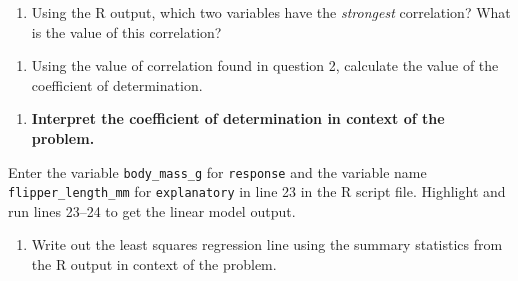 \documentclass[
]{report}
\newenvironment{Shaded}{\begin{snugshade}}{\end{snugshade}}
\newcommand{\AttributeTok}[1]{\textcolor[rgb]{0.77,0.63,0.00}{#1}}
\newcommand{\CommentTok}[1]{\textcolor[rgb]{0.56,0.35,0.01}{\textit{#1}}}
\newcommand{\FunctionTok}[1]{\textcolor[rgb]{0.00,0.00,0.00}{#1}}
\newcommand{\NormalTok}[1]{#1}
\newcommand{\OtherTok}[1]{\textcolor[rgb]{0.56,0.35,0.01}{#1}}
\newcommand{\SpecialCharTok}[1]{\textcolor[rgb]{0.00,0.00,0.00}{#1}}
\providecommand{\tightlist}{%
  \setlength{\itemsep}{0pt}\setlength{\parskip}{0pt}}
\begin{document}
\begin{enumerate}
\def\labelenumi{\arabic{enumi}.}
\setcounter{enumi}{1}
\tightlist
\item
  Using the R output, which two variables have the \emph{strongest} correlation? What is the value of this correlation?
\end{enumerate}

\vspace{0.5in}

\begin{enumerate}
\def\labelenumi{\arabic{enumi}.}
\setcounter{enumi}{2}
\tightlist
\item
  Using the value of correlation found in question 2, calculate the value of the coefficient of determination.
\end{enumerate}

\vspace{0.5in}

\begin{enumerate}
\def\labelenumi{\arabic{enumi}.}
\setcounter{enumi}{3}
\tightlist
\item
  \textbf{Interpret the coefficient of determination in context of the problem.}
\end{enumerate}

\vspace{1in}

Enter the variable \texttt{body\_mass\_g} for \texttt{response} and the variable name \texttt{flipper\_length\_mm} for \texttt{explanatory} in line 23 in the R script file. Highlight and run lines 23--24 to get the linear model output.

\begin{Shaded}
\end{Shaded}

\begin{enumerate}
\def\labelenumi{\arabic{enumi}.}
\setcounter{enumi}{4}
\tightlist
\item
  Write out the least squares regression line using the summary statistics from the R output in context of the problem.
\end{enumerate}
\end{document}
